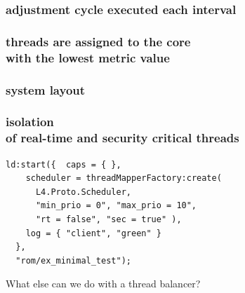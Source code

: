 \documentclass[utf8,10pt]{beamer}
\begin{document}
\begin{frame}
  \frametitle{adjustment cycle executed each interval}
  \centering
  
\end{frame}


\begin{frame}
  \frametitle{threads are assigned to the core \\ with the lowest metric value}
  \centering
  
\end{frame}


\begin{frame}
  \frametitle{system layout}
  \centering
  
\end{frame}


\begin{frame}[fragile]
  \frametitle{isolation \\of real-time and security critical threads}
  \centering
  \begin{minipage}[c]{\columnwidth}
    \begin{verbatim}
ld:start({  caps = { },
    scheduler = threadMapperFactory:create(
      L4.Proto.Scheduler,
      "min_prio = 0", "max_prio = 10",
      "rt = false", "sec = true" ),
    log = { "client", "green" }
  },
  "rom/ex_minimal_test");
    \end{verbatim}
  \end{minipage}
\end{frame}


\begin{frame}
  \centering
  What else can we do with a thread balancer?
\end{frame}
\end{document}
